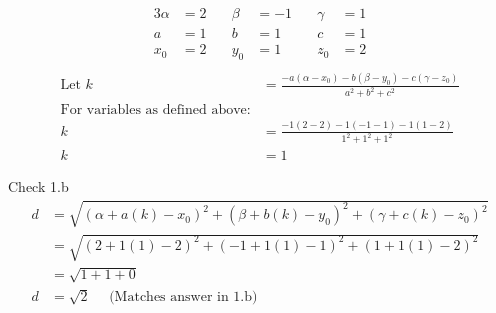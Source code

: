 \documentclass{article}
\begin{document}
\begin{alignat*}{3}
\alpha &= 2	\quad & \beta &= -1	\quad & \gamma &= 1 \\
a &= 1		\quad & b &= 1		\quad & c &= 1\\
x_0 &= 2		\quad & y_0 &= 1	\quad & z_0 &= 2\\
\end{alignat*}
\begin{align*}
\text{Let } k &= \frac{-a(\alpha - x_0) - b(\beta - y_0) - c(\gamma - z_0)}{a^2+b^2+c^2} \\
\text{For variables as defined above:} \\
k &= \frac{-1(2-2) - 1(-1-1) - 1(1-2)}{1^2 + 1^2 + 1^2} \\
k &= 1
\end{align*}

Check 1.b
\begin{align*}
d &= \sqrt{(\alpha + a(k) - x_0)^2 + (\beta + b(k) - y_0)^2 + (\gamma + c(k) - z_0)^2} \\
&= \sqrt{(2 + 1(1) - 2)^2 + (-1 + 1(1) - 1)^2 + (1 + 1(1) - 2)^2} \\
&= \sqrt{1 + 1 + 0} \\
d &= \sqrt{2} \quad \text{ (Matches answer in 1.b)}
\end{align*}
\end{document}

